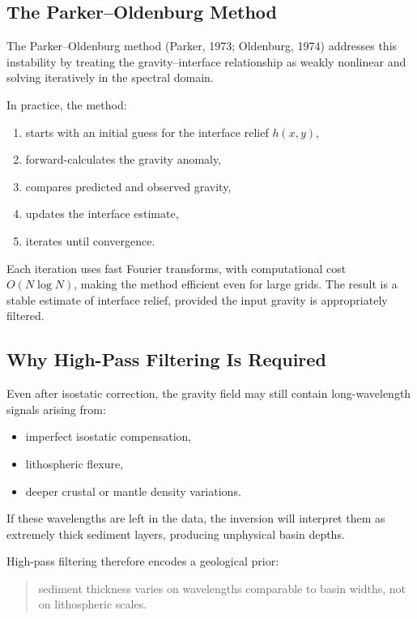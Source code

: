 \documentclass[11pt,a4paper]{article}
\begin{document}
\subsection{The Parker--Oldenburg Method}

The Parker--Oldenburg method (Parker, 1973; Oldenburg, 1974) addresses this instability
by treating the gravity--interface relationship as weakly nonlinear
and solving iteratively in the spectral domain.

In practice, the method:
\begin{enumerate}
  \item starts with an initial guess for the interface relief $h(x,y)$,
  \item forward-calculates the gravity anomaly,
  \item compares predicted and observed gravity,
  \item updates the interface estimate,
  \item iterates until convergence.
\end{enumerate}

Each iteration uses fast Fourier transforms, with computational cost
$O(N\log N)$, making the method efficient even for large grids.
The result is a stable estimate of interface relief, provided the input gravity
is appropriately filtered.

\subsection{Why High-Pass Filtering Is Required}

Even after isostatic correction, the gravity field may still contain
long-wavelength signals arising from:
\begin{itemize}
  \item imperfect isostatic compensation,
  \item lithospheric flexure,
  \item deeper crustal or mantle density variations.
\end{itemize}

If these wavelengths are left in the data,
the inversion will interpret them as extremely thick sediment layers,
producing unphysical basin depths.

High-pass filtering therefore encodes a geological prior:
\begin{quote}
sediment thickness varies on wavelengths comparable to basin widths,
not on lithospheric scales.
\end{quote}
\end{document}
